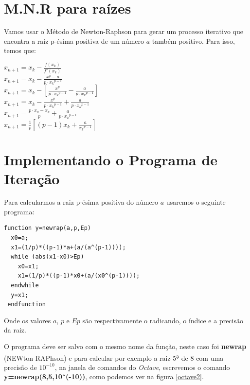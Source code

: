 \documentclass[11pt, openright, a4paper, brazil, openany, oneside]{abntex2}
\begin{document}
\section{M.N.R para raízes}

Vamos usar o Método de Newton-Raphson para gerar um processo iterativo que encontra a raiz p-ésima positiva de um número $a$ também positivo. Para isso, temos que:

\begin{center}

$ x_{n+1} = x_k - \frac{f(x_k)}{f'(x_k)}$ \\ $ x_{n+1} = x_k - \frac{x^p - a }{p \cdot {x_k}^{p-1}}$ \\ $ x_{n+1} = x_k - \left[ \frac{x^p}{p \cdot {x_k}^{p-1}} - \frac{a}{p \cdot {x_k}^{p-1}} \right]$ \\ $ x_{n+1} = x_k -  \frac{x^p}{p \cdot {x_k}^{p-1}} + \frac{a}{p \cdot {x_k}^{p-1}} $ \\ $ x_{n+1} = \frac {p \cdot x_k -  {x_k}}{p} + \frac{a}{p \cdot {x_k}^{p-1}} $ \\ $ x_{n+1} = \frac {1}{p} \left[( p-1)x_k + \frac{a}{{x_k}^{p-1}} \right] $

\end{center}

\section{Implementando o Programa de Iteração}

Para calcularmos a raiz p-ésima positiva do número $a$ usaremos o seguinte programa:

\begin{verbatim}
function y=newrap(a,p,Ep)
  x0=a;
  x1=(1/p)*((p-1)*a+(a/(a^(p-1))));
  while (abs(x1-x0)>Ep)
    x0=x1;
    x1=(1/p)*((p-1)*x0+(a/(x0^(p-1))));
  endwhile
  y=x1;
 endfunction
\end{verbatim}

Onde os valores $a$, $p$ e $Ep$ são respectivamente o radicando, o índice e a precisão da raiz. 

O programa deve ser salvo com o mesmo nome da função, neste caso foi \textbf{newrap} (NEWton-RAPhson) e para calcular por exemplo a raiz 5\textsuperscript{\d a} de 8 com uma precisão de $10^{-10}$, na janela de comandos do \textit{Octave}, escrevemos o comando \textbf{y=newrap(8,5,10}\verb|^|\textbf{(-10))}, como podemos ver na figura \ref{octave2}.
\end{document}
